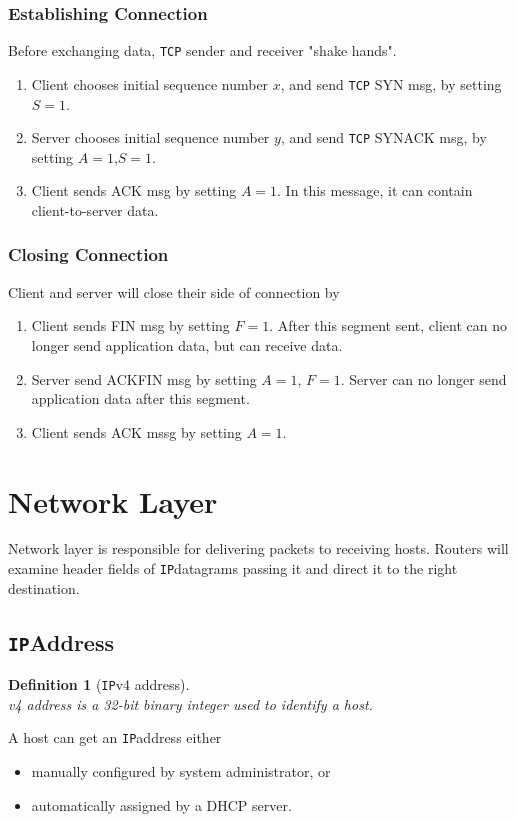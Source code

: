 \documentclass[12pt]{article}
\newcommand\TCP{\texttt{TCP} }
\newcommand\IP{\texttt{IP}}
\newtheorem{definition}{Definition}[section]
\theoremstyle{definition}
\begin{document}
  \subsubsection{Establishing Connection}
  Before exchanging data, \TCP sender and receiver "shake hands".
  \begin{enumerate}
    \item Client chooses initial sequence number $x$, and send \TCP SYN msg, by setting $S= 1$.
    \item Server chooses initial sequence number $y$, and send \TCP SYNACK msg, by setting $A = 1$,$S=1$.
    \item Client sends ACK msg by setting $A=1$. In this message, it can contain client-to-server data.
  \end{enumerate}
  \subsubsection{Closing Connection}
  Client and server will close their side of connection by
  \begin{enumerate}
    \item Client sends FIN msg by setting $F=1$. After this segment sent, client can no longer send application data, but can receive data.
    \item Server send ACKFIN msg by setting $A = 1$, $F = 1$. Server can no longer send application data after this segment.
    \item Client sends ACK mssg by setting $A = 1$.
  \end{enumerate}
  \clearpage
\section{Network Layer}
Network layer is responsible for delivering packets to receiving hosts. Routers will examine header fields of \IP datagrams passing it and direct it to the right destination.
\subsection{\IP Address}

\begin{definition}[{\IP}v4 address]
\hfill\\\normalfont {\IP}v4 address is a 32-bit binary integer used to identify a host.
\end{definition}
A host can get an \IP address either
\begin{itemize}
  \item manually configured by system administrator, or
  \item automatically assigned by a DHCP server.
\end{itemize}
\end{document}
